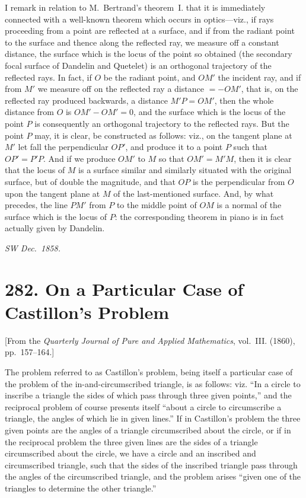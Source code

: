 \documentclass[11pt,a4paper]{article}
\theoremstyle{plain}
\begin{document}
I remark in relation to M.~Bertrand's theorem~I. that it is immediately connected with a well-known theorem which occurs in optics---viz., if rays proceeding from a point are reflected at a surface, and if from the radiant point to the surface and thence along the reflected ray, we measure off a constant distance, the surface which is the locus of the point so obtained (the secondary focal surface of Dandelin and Quetelet) is an orthogonal trajectory of the reflected rays. In fact, if $O$ be the radiant point, and $OM'$ the incident ray, and if from $M'$ we measure off on the reflected ray a distance $= -OM'$, that is, on the reflected ray produced backwards, a distance $M'P = OM'$, then the whole distance from $O$ is $OM' - OM' = 0$, and the surface which is the locus of the point $P$ is consequently an orthogonal trajectory to the reflected rays. But the point $P$ may, it is clear, be constructed as follows: viz., on the tangent plane at $M'$ let fall the perpendicular $OP'$, and produce it to a point $P$ such that $OP' = P'P$. And if we produce $OM'$ to $M$ so that $OM' = M'M$, then it is clear that the locus of $M$ is a surface similar and similarly situated with the original surface, but of double the magnitude, and that $OP$ is the perpendicular from $O$ upon the tangent plane at $M$ of the last-mentioned surface. And, by what precedes, the line $PM'$ from $P$ to the middle point of $OM$ is a normal of the surface which is the locus of $P$: the corresponding theorem in piano is in fact actually given by Dandelin.

\hfill\textit{SW Dec.~1858.}


\newpage
\section*{282. On a Particular Case of Castillon's Problem}
\label{sec:282}

[From the \textit{Quarterly Journal of Pure and Applied Mathematics}, vol.~III. (1860), pp.~157--164.]

The problem referred to as Castillon's problem, being itself a particular case of the problem of the in-and-circumscribed triangle, is as follows: viz. ``In a circle to inscribe a triangle the sides of which pass through three given points,'' and the reciprocal problem of course presents itself ``about a circle to circumscribe a triangle, the angles of which lie in given lines.'' If in Castillon's problem the three given points are the angles of a triangle circumscribed about the circle, or if in the reciprocal problem the three given lines are the sides of a triangle circumscribed about the circle, we have a circle and an inscribed and circumscribed triangle, such that the sides of the inscribed triangle pass through the angles of the circumscribed triangle, and the problem arises ``given one of the triangles to determine the other triangle.''
\end{document}
